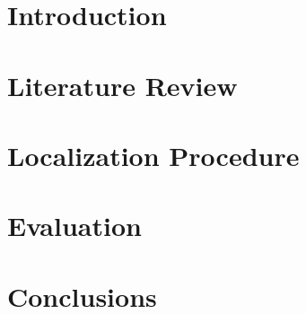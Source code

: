 \documentclass[conference]{IEEEtran}
\begin{document}
\section{Introduction} \label{introduction}
  

\section{Literature Review} \label{literature}
  

\section{Localization Procedure} \label{locProc}
  

\section{Evaluation} \label{simulation}
  

\section{Conclusions} \label{conclusions}
  



\end{document}
